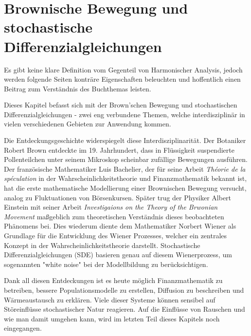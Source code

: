 %
%
%
%
\chapter{Brownische Bewegung und stochastische Differenzialgleichungen\label{chapter:brown}}
\begin{refsection}

Es gibt keine klare Definition vom Gegenteil von Harmonischer Analysis, jedoch werden folgende Seiten konträre Eigenschaften beleuchten und hoffentlich einen Beitrag zum Verständnis des Buchthemas leisten.


Dieses Kapitel befasst sich mit der Brown'schen Bewegung und stochastischen Differenzialgleichungen - zwei eng verbundene Themen, welche interdisziplinär in vielen verschiedenen Gebieten zur Anwendung kommen.

Die Entdeckungsgeschichte widerspiegelt diese Interdisziplinarität. Der Botaniker Robert Brown entdeckte im 19. Jahrhundert, dass in Flüssigkeit suspendierte Pollenteilchen unter seinem Mikroskop scheinbar zufällige Bewegungen ausführen. Der französische Mathematiker Luis Bachelier, der für seine Arbeit \textit{Théorie de la spéculation} in der Wahrscheinlichkeitstheorie und Finanzmathematik bekannt ist, hat die erste mathematische Modellierung einer Brownischen Bewegung versucht, analog zu Fluktuationen von Börsenkursen. Später trug der Physiker Albert Einstein mit seiner Arbeit \textit{Investigaions on the Theory of the Brwonian Movement} maßgeblich zum theoretischen Verständnis dieses beobachteten Phänomens bei. Dies wiederum diente dem Mathematiker Norbert Wiener als Grundlage für die Entwicklung des Wiener Prozesses, welcher ein zentrales Konzept in der Wahrscheinlichkeitstheorie darstellt. Stochastische Differenzialgleichungen (SDE) basieren genau auf diesem Wienerprozess, um sogenannten "white noise" bei der Modellbildung zu berücksichtigen. 

Dank all diesen Entdeckungen ist es heute möglich Finanzmathematik zu betreiben, bessere Populationsmodelle zu erstellen, Diffusion zu beschreiben und Wärmeaustausch zu erklären. Viele dieser Systeme können sensibel auf Störeinflüsse stochastischer Natur reagieren. Auf die Einflüsse von Rauschen und wie man damit umgehen kann, wird im letzten Teil dieses Kapitels noch eingegangen.







\printbibliography[heading=subbibliography]
\end{refsection}

